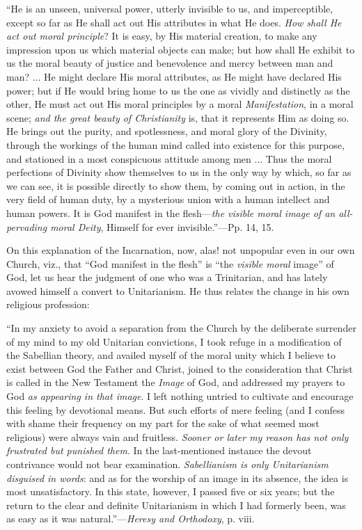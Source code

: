 ``He is an
unseen, universal power, utterly invisible to us, and imperceptible,
except so far as He shall act out His attributes in what He does. \emph{How
shall He act out moral principle}? It is easy, by His material
creation, to make any impression upon us which material objects can
make; but how shall He exhibit to us the moral beauty of justice and
benevolence and mercy between man and man? ... He might declare His
moral attributes, as He might have declared His power; but if He would
bring home to us the one as vividly and distinctly as the other, He
must act out His moral principles by a moral \emph{Manifestation}, in
a moral scene; \emph{and the great beauty of Christianity} is, that it
represents Him as doing so. He brings out the purity, and
spotlessness, and moral glory of the Divinity, through the workings of
the human mind called into existence for this purpose, and stationed
in a most conspicuous attitude among men ... Thus the moral
perfections of Divinity show themselves to us in the only way by
which, so far as we can see, it is possible directly to show them, by
coming out in action, in the very field of human duty, by a mysterious
union with a human intellect and human powers. It is God manifest in
the flesh—\emph{the visible moral image of an all-pervading moral Deity},
Himself for ever invisible.''—Pp. 14, 15.

On this explanation of the Incarnation, now,
alas! not unpopular even in our own Church, viz., that ``God manifest
in the flesh'' is ``the \emph{visible moral} image'' of God, let us
hear the judgment of one who was a Trinitarian, and has lately avowed
himself a convert to Unitarianism. He thus relates the change in his
own religious profession:

``In my anxiety
to avoid a separation from the Church by the deliberate surrender of
my mind to my old Unitarian convictions, I took refuge in a
modification of the Sabellian theory, and availed myself
of the moral unity which I believe to exist between God the Father and
Christ, joined to the consideration that Christ is called in the New
Testament the \emph{Image} of God, and addressed my prayers to God \emph{as
appearing in that image}. I left nothing untried to cultivate and
encourage this feeling by devotional means. But such efforts of mere
feeling (and I confess with shame their frequency on my part for the
sake of what seemed most religious) were always vain and fruitless. \emph{Sooner
or later my reason has not only frustrated but punished them}. In
the last-mentioned instance the devout contrivance would not bear
examination. \emph{Sabellianism is only Unitarianism disguised in words}:
and as for the worship of an image in its absence, the idea is most
unsatisfactory. In this state, however, I passed five or six years;
but the return to the clear and definite Unitarianism in which I had
formerly been, was as easy as it was natural.''—\emph{Heresy and
Orthodoxy}, p. viii.

